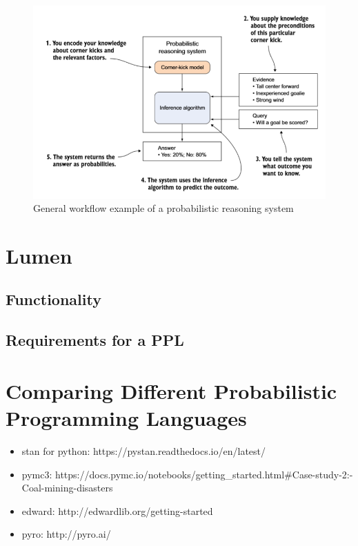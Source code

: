 \documentclass{article}
\begin{document}
\begin{figure}
	\includegraphics[width=\textwidth]{images/probabilistic_reasoning_system.PNG}
	\caption[General workflow example of a probabilistic reasoning system. Source: \cite{9781617292330}]{General workflow example of a probabilistic reasoning system}
	\label{fig:example_prs}
\end{figure}

\section{Lumen}

\subsection{Functionality}

\subsection{Requirements for a PPL}

\section{Comparing Different Probabilistic Programming Languages}

\begin{itemize}
     \item stan for python: https://pystan.readthedocs.io/en/latest/
    \item pymc3: https://docs.pymc.io/notebooks/getting\_started.html\#Case-study-2:-Coal-mining-disasters
    \item edward: http://edwardlib.org/getting-started
    \item pyro: http://pyro.ai/
\end{itemize}
\end{document}
